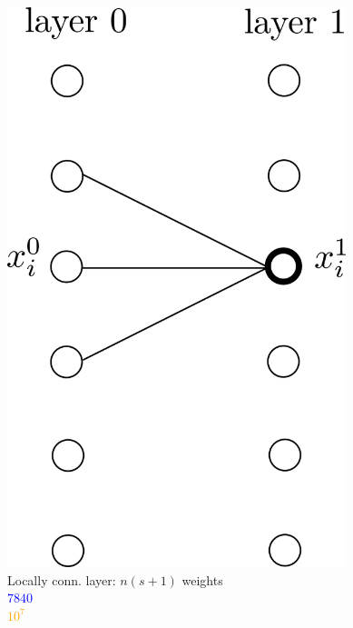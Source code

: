 \documentclass[xcolor=pdftex,dvipsnames,table,mathserif]{beamer}
\begin{document}
{\begin{columns}
    \begin{column}{0.3\textwidth}
      \begin{center}
        \includegraphics[width=0.74\textwidth]{locally_connected_layer.png}
        \\ \scriptsize{Locally conn. layer: $n(s+1)$ weights}
        \\ \textcolor{blue}{\scriptsize{$7840$}}
        \\ \textcolor{orange}{\scriptsize{$10^7$}}
      \end{center}
    \end{column}


\end{columns}}
\end{document}
